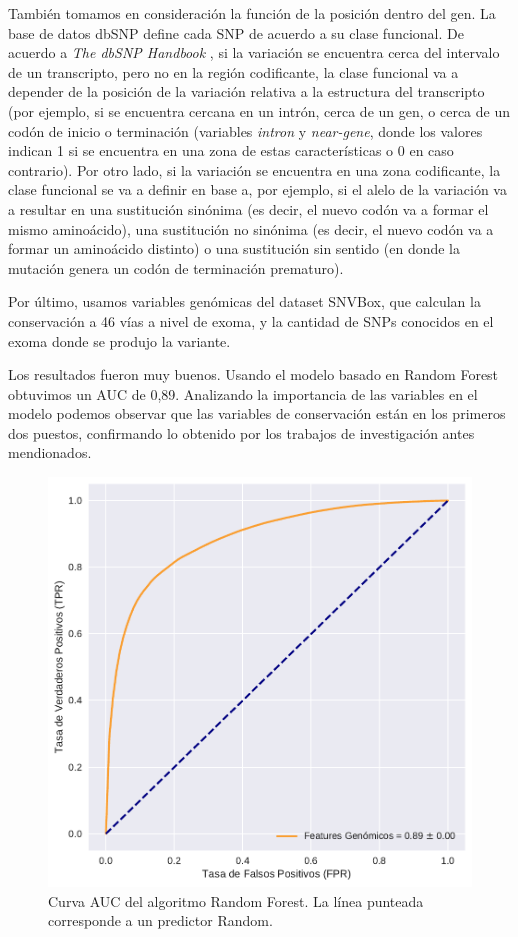 También tomamos en consideración la función de la posición dentro del gen. La base de datos dbSNP define cada SNP de acuerdo a su clase funcional. De acuerdo a \textit{The dbSNP Handbook} \cite{Ostell2007}, si la variación se encuentra cerca del intervalo de un transcripto, pero no en la región codificante,  la clase funcional va a depender de la posición de la variación relativa a la estructura del transcripto (por ejemplo, si se encuentra cercana en un intrón, cerca de un gen, o cerca de un codón de inicio o terminación (variables \textit{intron} y \textit{near-gene}, donde los valores indican 1 si se encuentra en una zona de estas características o 0 en caso contrario). Por otro lado, si la variación se encuentra en una zona codificante, la clase funcional se va a definir en base a, por ejemplo, si el alelo de la variación va a resultar en una sustitución sinónima (es decir, el nuevo codón va a formar el mismo aminoácido), una sustitución no sinónima (es decir, el nuevo codón va a formar un aminoácido distinto) o una sustitución sin sentido (en donde la mutación genera un codón de terminación prematuro).

Por último, usamos variables genómicas del dataset SNVBox, que calculan la conservación a 46 vías a nivel de exoma, y la cantidad de SNPs conocidos en el exoma donde se produjo la variante. 

Los resultados fueron muy buenos. Usando el modelo basado en Random Forest obtuvimos un AUC de 0,89. Analizando la importancia de las variables en el modelo podemos observar que las variables de conservación están en los primeros dos puestos, confirmando lo obtenido por los trabajos de investigación antes mendionados. 


\begin{figure}[H]
    \centering
    \includegraphics[scale=0.73]{documents/latex/figures/3/auc_2.pdf}
    \caption{Curva AUC del algoritmo Random Forest. La línea punteada corresponde a un predictor Random.}
    \label{fig:auc_2}
\end{figure}


